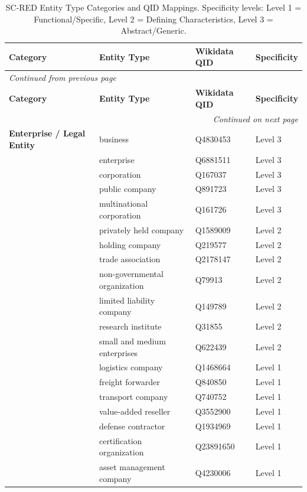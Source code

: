 \begin{appendices}
\begingroup
\small
\setlength{\LTcapwidth}{\textwidth}
\begin{longtable}{l|p{5cm}|p{3cm}|l}

\caption{SC-RED Entity Type Categories and QID Mappings. Specificity
levels: Level 1 = Functional/Specific, Level 2 = Defining
Characteristics, Level 3 = Abstract/Generic.}
\label{tab:entity_categories} \\

\toprule
\textbf{Category} & \textbf{Entity Type} & \textbf{Wikidata QID}
& \textbf{Specificity} \\
\midrule
\endfirsthead

\multicolumn{4}{l}{\small\textit{Continued from previous page}} \\
\toprule
\textbf{Category} & \textbf{Entity Type} & \textbf{Wikidata QID}
& \textbf{Specificity} \\
\midrule
\endhead

\midrule
\multicolumn{4}{r}{\small\textit{Continued on next page}} \\
\endfoot

\bottomrule
\endlastfoot

\textbf{Enterprise / Legal Entity}
& business                   & Q4830453  & Level 3 \\
& enterprise                 & Q6881511  & Level 3 \\
& corporation                & Q167037   & Level 3 \\
& public company             & Q891723   & Level 3 \\
& multinational corporation  & Q161726   & Level 3 \\
& privately held company     & Q1589009  & Level 2 \\
& holding company            & Q219577   & Level 2 \\
& trade association          & Q2178147  & Level 2 \\
& non-governmental organization & Q79913 & Level 2 \\
& limited liability company  & Q149789   & Level 2 \\
& research institute         & Q31855    & Level 2 \\
& small and medium enterprises & Q622439 & Level 2 \\
& logistics company          & Q1468664  & Level 1 \\
& freight forwarder          & Q840850   & Level 1 \\
& transport company          & Q740752   & Level 1 \\
& value-added reseller       & Q3552900  & Level 1 \\
& defense contractor         & Q1934969  & Level 1 \\
& certification organization & Q23891650 & Level 1 \\
& asset management company   & Q4230006  & Level 1 \\
\midrule


\end{longtable}
\end{appendices}
